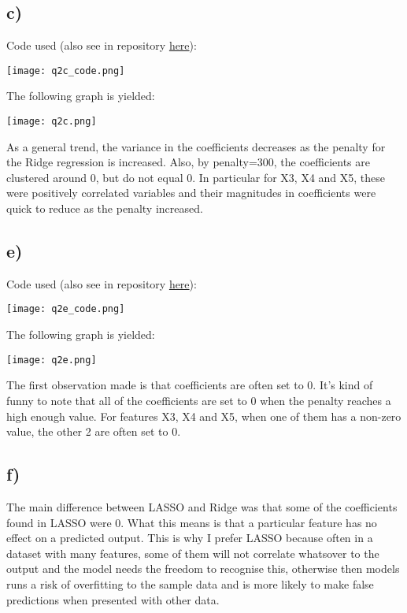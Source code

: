 \documentclass{article}
\begin{document}
\subsection*{c)}

Code used (also see in repository \href{https://github.com/william-coulter/COMP9417_Homework_1/tree/master/python}{here}):

\texttt{[image: q2c\_code.png]}


\newpage
The following graph is yielded:

\texttt{[image: q2c.png]}

As a general trend, the variance in the coefficients decreases as the penalty 
for the Ridge regression is increased. Also, by penalty=300, the coefficients are 
clustered around 0, but do not equal 0. In particular for X3, X4 and X5, these were positively
correlated variables and their magnitudes in coefficients were quick to 
reduce as the penalty increased.


\newpage
\subsection*{e)}

Code used (also see in repository \href{https://github.com/william-coulter/COMP9417_Homework_1/tree/master/python}{here}):

\texttt{[image: q2e\_code.png]}

\newpage
The following graph is yielded:

\texttt{[image: q2e.png]}

The first observation made is that coefficients are often set to 0. It's kind of funny to note that 
all of the coefficients are set to 0 when the penalty reaches a high enough value.
For features X3, X4 and X5, when one of them has a non-zero value, the other 
2 are often set to 0.

\subsection*{f)}

The main difference between LASSO and Ridge was that some of the coefficients found in LASSO
were 0. What this means is that a particular feature has no effect on a predicted output.
This is why I prefer LASSO because often in a dataset with many features, some of them 
will not correlate whatsover to the output and the model needs the freedom to recognise this, otherwise
then models runs a risk of overfitting to the sample data and is more likely to make false predictions when presented
with other data.
\end{document}
